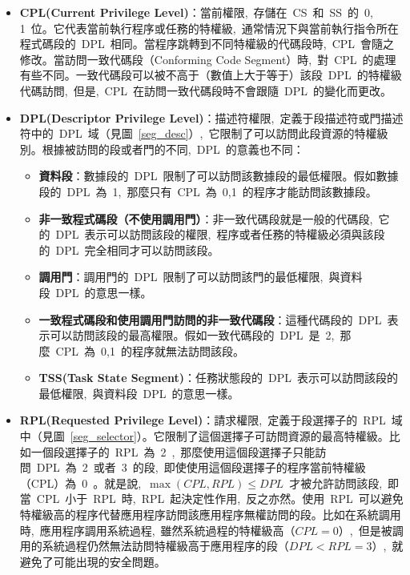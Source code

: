 \begin{itemize}
\item{\textbf{CPL(Current Privilege Level)}}：當前權限,~存儲在~CS~和~SS~的~0, 1~位。它代表當前執行程序或任務的特權級,~通常情況下與當前執行指令所在程式碼段的~DPL~相同。當程序跳轉到不同特權級的代碼段時,~CPL~會隨之修改。當訪問一致代碼段（Conforming Code Segment）時,~對~CPL~的處理有些不同。一致代碼段可以被不高于（數值上大于等于）該段~DPL~的特權級代碼訪問,~但是,~CPL~在訪問一致代碼段時不會跟隨~DPL~的變化而更改。

\item{\textbf{DPL(Descriptor Privilege Level)}}：描述符權限,~定義于段描述符或門描述符中的~DPL~域（見圖~\ref{seg_desc}）,~它限制了可以訪問此段資源的特權級別。根據被訪問的段或者門的不同,~DPL~的意義也不同：
  \begin{itemize}
  \item{\textbf{資料段}}：數據段的~DPL~限制了可以訪問該數據段的最低權限。假如數據段的~DPL~為~1,~那麼只有~CPL~為~0,1~的程序才能訪問該數據段。
  \item{\textbf{非一致程式碼段（不使用調用門）}}：非一致代碼段就是一般的代碼段,~它的~DPL~表示可以訪問該段的權限,~程序或者任務的特權級必須與該段的~DPL~完全相同才可以訪問該段。
  \item{\textbf{調用門}}：調用門的~DPL~限制了可以訪問該門的最低權限,~與資料段~DPL~的意思一樣。
  \item{\textbf{一致程式碼段和使用調用門訪問的非一致代碼段}}：這種代碼段的~DPL~表示可以訪問該段的最高權限。假如一致代碼段的~DPL~是~2,~那麼~CPL~為~0,1~的程序就無法訪問該段。
  \item{\textbf{TSS(Task State Segment)}}：任務狀態段的~DPL~表示可以訪問該段的最低權限,~與資料段~DPL~的意思一樣。
  \end{itemize}

\item{\textbf{RPL(Requested Privilege Level)}}：請求權限,~定義于段選擇子的~RPL~域中（見圖~\ref{seg_selector}）。它限制了這個選擇子可訪問資源的最高特權級。比如一個段選擇子的~RPL~為~2~,~那麼使用這個段選擇子只能訪問~DPL~為~2~或者~3~的段,~即使使用這個段選擇子的程序當前特權級（CPL）為~0~。就是說,~$\max{(CPL, RPL)}\le DPL$~才被允許訪問該段,~即當~CPL~小于~RPL~時,~RPL~起決定性作用,~反之亦然。使用~RPL~可以避免特權級高的程序代替應用程序訪問該應用程序無權訪問的段。比如在系統調用時,~應用程序調用系統過程,~雖然系統過程的特權級高（$CPL=0$）,~但是被調用的系統過程仍然無法訪問特權級高于應用程序的段（$DPL<RPL=3$）,~就避免了可能出現的安全問題。
\end{itemize}

